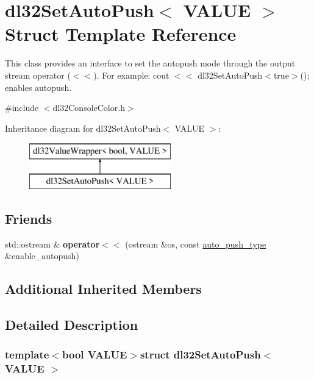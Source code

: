 \hypertarget{structdl32_set_auto_push}{\section{dl32\-Set\-Auto\-Push$<$ V\-A\-L\-U\-E $>$ Struct Template Reference}
\label{structdl32_set_auto_push}
}


This class provides an interface to set the autopush mode through the output stream operator ($<$$<$). For example\-: cout $<$$<$ dl32\-Set\-Auto\-Push$<$true$>$(); enables autopush.  




{\ttfamily \#include $<$dl32\-Console\-Color.\-h$>$}

Inheritance diagram for dl32\-Set\-Auto\-Push$<$ V\-A\-L\-U\-E $>$\-:\begin{figure}[H]
\begin{center}
\leavevmode
\includegraphics[height=2.000000cm]{structdl32_set_auto_push}
\end{center}
\end{figure}
\subsection*{Friends}
\begin{DoxyCompactItemize}
\item 
\hypertarget{structdl32_set_auto_push_a639f244188a02e26a6013f47efc0e99e}{std\-::ostream \& {\bfseries operator$<$$<$} (ostream \&os, const \hyperlink{structdl32_set_auto_push}{auto\-\_\-push\-\_\-type} \&enable\-\_\-autopush)}\label{structdl32_set_auto_push_a639f244188a02e26a6013f47efc0e99e}

\end{DoxyCompactItemize}
\subsection*{Additional Inherited Members}


\subsection{Detailed Description}
\subsubsection*{template$<$bool V\-A\-L\-U\-E$>$struct dl32\-Set\-Auto\-Push$<$ V\-A\-L\-U\-E $>$}

